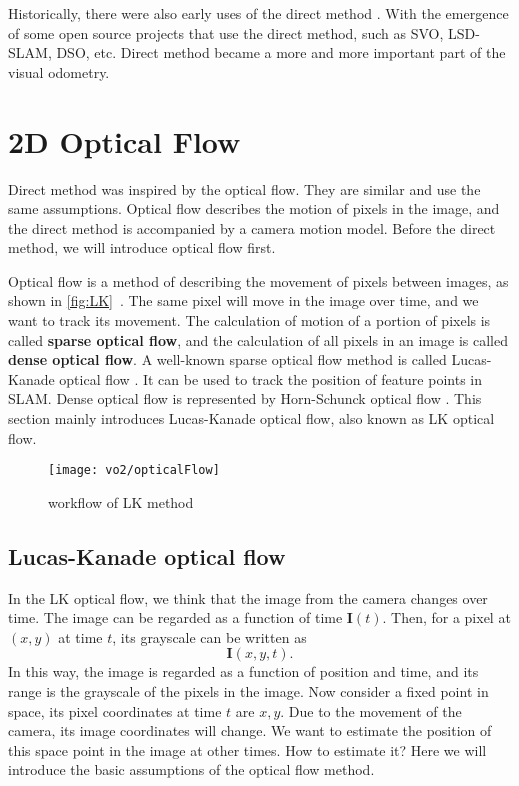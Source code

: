 Historically, there were also early uses of the direct method \textsuperscript{\cite{Silveira2008}}. With the emergence of some open source projects that use the direct method, such as SVO\textsuperscript{\cite{Forster2014}}, LSD-SLAM\textsuperscript{\cite{Engel2014}}, DSO\textsuperscript{\cite{Engel2016}}, etc. Direct method became a more and more important part of the visual odometry.

\section{2D Optical Flow}
Direct method was inspired by the optical flow. They are similar and use the same assumptions. Optical flow describes the motion of pixels in the image, and the direct method is accompanied by a camera motion model. Before the direct method, we will introduce optical flow first.

Optical flow is a method of describing the movement of pixels between images, as shown in \autoref{fig:LK}~. The same pixel will move in the image over time, and we want to track its movement. The calculation of motion of a portion of pixels is called \textbf{sparse optical flow}, and the calculation of all pixels in an image is called \textbf{dense optical flow}. A well-known sparse optical flow method is called Lucas-Kanade optical flow \textsuperscript{\cite{Lucas1981}}. It can be used to track the position of feature points in SLAM. Dense optical flow is represented by Horn-Schunck optical flow \textsuperscript{\cite{Horn1981}}. This section mainly introduces Lucas-Kanade optical flow, also known as LK optical flow.

\begin{figure}[!htp]
	\centering
	\texttt{[image: vo2/opticalFlow]}
	\caption{workflow of LK method}
	\label{fig:LK}
\end{figure}

\subsection*{Lucas-Kanade optical flow}
In the LK optical flow, we think that the image from the camera changes over time. The image can be regarded as a function of time $\mathbf{I}(t)$. Then, for a pixel at $(x,y)$ at time $t$, its grayscale can be written as
\[
\mathbf{I}(x,y,t).
\]
In this way, the image is regarded as a function of position and time, and its range is the grayscale of the pixels in the image. Now consider a fixed point in space, its pixel coordinates at time $t$ are $x,y$. Due to the movement of the camera, its image coordinates will change. We want to estimate the position of this space point in the image at other times. How to estimate it? Here we will introduce the basic assumptions of the optical flow method.

